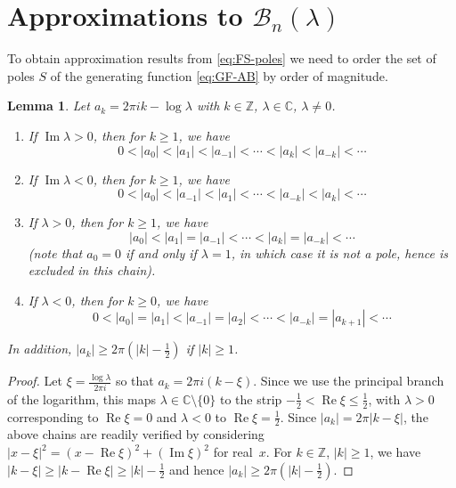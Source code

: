 \documentclass[11pt,a4paper]{amsart}
\newcommand{\Z}{\mathbb{Z}}
\newcommand{\C}{\mathbb{C}}
\newcommand{\B}{\mathcal{B}}
\renewcommand{\Re}{\operatorname{Re}}
\renewcommand{\Im}{\operatorname{Im}}
\theoremstyle{plain}
\newtheorem{lemma}{Lemma}
\theoremstyle{remark}
\begin{document}
\section{Approximations to $\B_{n}(\lambda)$}
\label{sec:approx-ABN}




To obtain approximation results from \eqref{eq:FS-poles} we need to order the set of poles $S$ of the generating function \eqref{eq:GF-AB} by order of magnitude.

\begin{lemma}
\label{lem:pole-ordering}
Let $a_{k} = 2 \pi i k - \log \lambda$ with $k \in \Z$, $\lambda \in \C$, $\lambda \neq 0$.
\begin{enumerate}
%
	\item[(a)] If $\Im\lambda > 0$, then for $k \geq 1$, we have
	$$
		0 < |a_{0}| < |a_{1}| < |a_{-1}| < \cdots < |a_{k}| < |a_{-k}| < \cdots
	$$

	\item[(b)] If $\Im\lambda < 0$, then for $k \geq 1$, we have
	$$
		0 < |a_{0}| < |a_{-1}| < |a_{1}| < \cdots < |a_{-k}| < |a_{k}| < \cdots
	$$

	\item[(c)] If $\lambda > 0$, then for $k \geq 1$, we have
	$$
		|a_{0}| < |a_{1}| = |a_{-1}| < \cdots < |a_{k}| = |a_{-k}| < \cdots
	$$
	(note that $a_{0} = 0$ if and only if $\lambda = 1$, in which case it is not a pole, hence is excluded in this chain).

	\item[(d)] If $\lambda < 0$, then for $k \geq 0$, we have
	$$
		0 < |a_{0}| = |a_{1}| < |a_{-1}| = |a_{2}| < \cdots < |a_{-k}| = |a_{k+1}| < \cdots
	$$
%
\end{enumerate}
In addition, $|a_{k}| \geq 2\pi (|k| - \frac{1}{2})$ if $|k| \geq 1$.
\end{lemma}

\begin{proof}
Let $\xi = \frac{\log\lambda}{2\pi i}$ so that $a_{k} = 2\pi i(k - \xi)$. Since we use the principal branch of the logarithm, this maps $\lambda \in \C \setminus \{0\}$ to the strip
$-\frac{1}{2} < \Re \xi \leq \frac{1}{2}$,
with $\lambda > 0$ corresponding to $\Re\xi = 0$ and $\lambda < 0$ to $\Re\xi = \frac{1}{2}$.
Since $|a_{k}| = 2\pi |k - \xi|$, the above chains are readily verified by considering 
$|x-\xi|^2 = (x-\Re\xi)^2+(\Im\xi)^2$ for real~$x$.
For $k \in \Z$, $|k| \geq 1$, we have $|k - \xi| \geq |k - \Re\xi| \geq |k| - \frac{1}{2}$ and hence $|a_{k}| \geq 2\pi (|k| - \frac{1}{2})$.
\end{proof}
\end{document}
